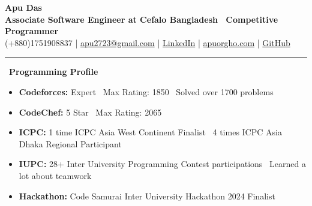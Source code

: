 \documentclass[letterpaper,10.5pt]{article}
\newcommand{\cvsection}[2]{%
  \vspace{2pt}
  \begin{tcolorbox}[
      enhanced, colback=accentSoft, colframe=accentSoft,
      boxrule=0pt, arc=3pt, left=8pt, right=8pt, top=1.5pt, bottom=1.5pt,
      before skip=0pt, after skip=3pt
    ]
    {\color{accentDark}\faIcon{#1}~\sffamily\bfseries #2}
  \end{tcolorbox}
}
\newcommand{\resumeItem}[1]{\item\small{#1\vspace{-2pt}}}
\newcommand{\resumeSubHeadingListStart}{\begin{itemize}[leftmargin=0.15in, label={}]}
\newcommand{\resumeSubHeadingListEnd}{\end{itemize}}
\begin{document}
\color{ink}

\begin{center}
  {\sffamily\bfseries\fontsize{24}{26}\selectfont Apu Das}\\[1pt]
  {\color{accent}\sffamily\bfseries Associate Software Engineer at Cefalo Bangladesh \textbullet\ Competitive Programmer}\\[4pt]
  {\small\color{muted}
     (+880)1751908837 \quad\textcolor{hairline}{|}\quad
     \href{mailto:apu2723@gmail.com}{apu2723@gmail.com} \quad\textcolor{hairline}{|}\quad
     \href{https://www.linkedin.com/in/apu-das-orgho-5a72a7219/}{LinkedIn} \quad\textcolor{hairline}{|}\quad
     \href{https://apuorgho.com}{apuorgho.com} \quad\textcolor{hairline}{|}\quad
     \href{https://github.com/ApuOrgho}{GitHub}
  }\\[2pt]
  {\color{accent}\rule{\textwidth}{1.2pt}}
\end{center}

\cvsection{trophy}{Programming Profile}
\resumeSubHeadingListStart
  \resumeItem{\textbf{Codeforces:} Expert \textbullet\ Max Rating: 1850 \textbullet\ Solved over 1700 problems}
  \resumeItem{\textbf{CodeChef:} 5 Star \textbullet\ Max Rating: 2065}
  \resumeItem{\textbf{ICPC:} 1 time ICPC Asia West Continent Finalist \textbullet\ 4 times ICPC Asia Dhaka Regional Participant}
  \resumeItem{\textbf{IUPC:} 28+ Inter University Programming Contest participations \textbullet\ Learned a lot about teamwork}
  \resumeItem{\textbf{Hackathon:} Code Samurai Inter University Hackathon 2024 Finalist}
\resumeSubHeadingListEnd
\end{document}
